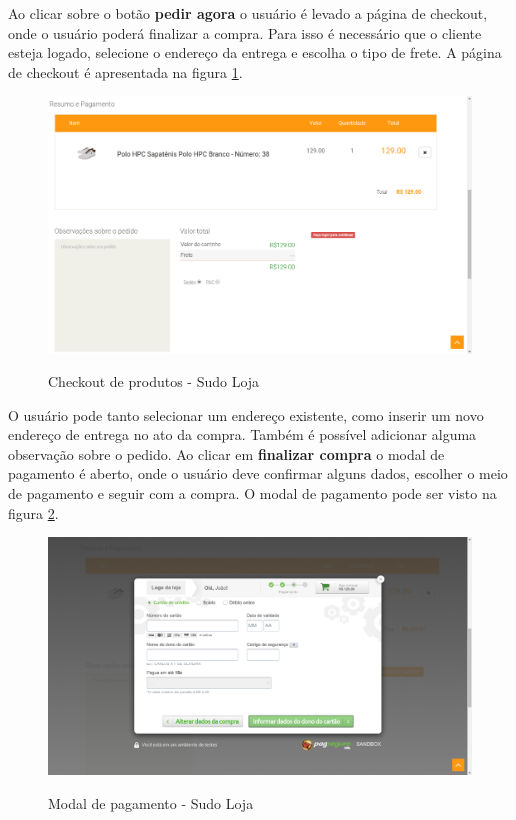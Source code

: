 \documentclass[a4paper,12pt]{monografia}
\begin{document}
Ao clicar sobre o botão \textbf{pedir agora} o usuário é levado a página de checkout, onde o usuário poderá finalizar a compra. Para isso é necessário que o cliente esteja logado, selecione o endereço da entrega e escolha o tipo de frete. A página de checkout é apresentada na figura \ref{fig:checkout}.

\begin{figure}[H]
\centering
\caption{Checkout de produtos - Sudo Loja}
\centering
\includegraphics[width=15cm]{img/sistema/checkout.png.eps}\\
\label{fig:checkout}
\end{figure} 

O usuário pode tanto selecionar um endereço existente, como inserir um novo endereço de entrega no ato da compra. Também é possível adicionar alguma observação sobre o pedido. Ao clicar em \textbf{finalizar compra} o modal de pagamento é aberto, onde o usuário deve confirmar alguns dados, escolher o meio de pagamento e seguir com a compra. O modal de pagamento pode ser visto na figura \ref{fig:pagamento}.

\begin{figure}[H]
\centering
\caption{Modal de pagamento - Sudo Loja}
\centering
\includegraphics[width=15cm]{img/sistema/pagamento.png.eps}\\
\label{fig:pagamento}
\end{figure} 
\end{document}
